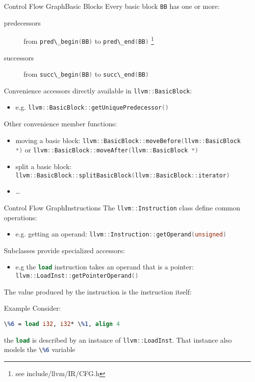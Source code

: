 \documentclass[10pt,mathserif]{beamer}
\newcommand{\cppinline}[1]{\lstinline[language=C++]!#1!}
\newcommand{\llvminline}[1]{\lstinline[language=LLVM]!#1!}
\begin{document}
\begin{frame}{Control Flow Graph}{Basic Blocks}
Every basic block \cppinline{BB} has one or more:

\begin{description}
\item[predecessors] from \cppinline{pred\_begin(BB)} to
      \cppinline{pred\_end(BB)} \footnote{see include/llvm/IR/CFG.h}
\item[successors] from \cppinline{succ\_begin(BB)} to
      \cppinline{succ\_end(BB)}
\end{description}

Convenience accessors directly available in \cppinline{llvm::BasicBlock}:

\begin{itemize}
\item e.g. \cppinline{llvm::BasicBlock::getUniquePredecessor()}
\end{itemize}

Other convenience member functions:

\begin{itemize}
\item moving a basic block:
      \cppinline{llvm::BasicBlock::moveBefore(llvm::BasicBlock *)} or
      \cppinline{llvm::BasicBlock::moveAfter(llvm::BasicBlock *)}
\item split a basic block:
      \cppinline{llvm::BasicBlock::splitBasicBlock(llvm::BasicBlock::iterator)}
\item \ldots
\end{itemize}
\end{frame}

\begin{frame}{Control Flow Graph}{Instructions}
The \cppinline{llvm::Instruction} class define common operations:

\begin{itemize}
\item e.g. getting an operand: \cppinline{llvm::Instruction::getOperand(unsigned)}
\end{itemize}

Subclasses provide specialized accessors:

\begin{itemize}
\item e.g the \llvminline{load} instruction takes an operand that is a pointer:
      \cppinline{llvm::LoadInst::getPointerOperand()}
\end{itemize}

The value produced by the instruction is the \alert{instruction itself}:

\begin{block}{Example}
Consider:

\centering
\llvminline{\%6 = load i32, i32* \%1, align 4}

\flushleft
the \llvminline{load} is described
by an instance of \cppinline{llvm::LoadInst}. That instance also models the
\llvminline{\%6} variable
\end{block}
\end{frame}
\end{document}
